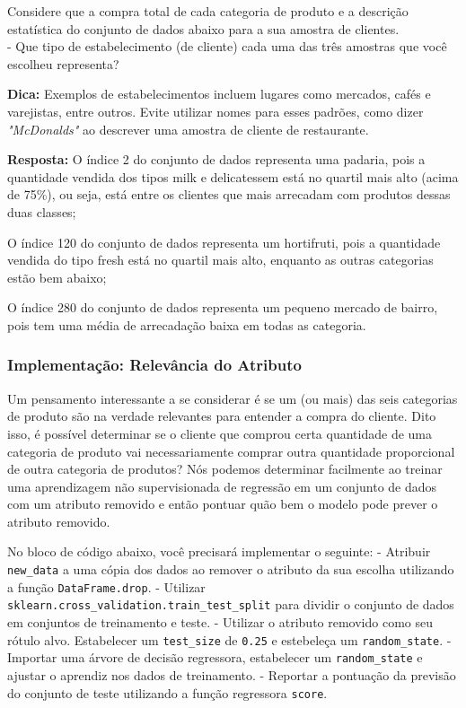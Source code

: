 \documentclass[11pt]{article}
\begin{document}
Considere que a compra total de cada categoria de produto e a descrição
estatística do conjunto de dados abaixo para a sua amostra de
clientes.\\
- Que tipo de estabelecimento (de cliente) cada uma das três amostras
que você escolheu representa?

\textbf{Dica:} Exemplos de estabelecimentos incluem lugares como
mercados, cafés e varejistas, entre outros. Evite utilizar nomes para
esses padrões, como dizer \emph{"McDonalds"} ao descrever uma amostra de
cliente de restaurante.

    \textbf{Resposta:} O índice 2 do conjunto de dados representa uma
padaria, pois a quantidade vendida dos tipos milk e delicatessem está no
quartil mais alto (acima de 75\%), ou seja, está entre os clientes que
mais arrecadam com produtos dessas duas classes;

O índice 120 do conjunto de dados representa um hortifruti, pois a
quantidade vendida do tipo fresh está no quartil mais alto, enquanto as
outras categorias estão bem abaixo;

O índice 280 do conjunto de dados representa um pequeno mercado de
bairro, pois tem uma média de arrecadação baixa em todas as categoria.

    \subsubsection{Implementação: Relevância do
Atributo}\label{implementauxe7uxe3o-relevuxe2ncia-do-atributo}

Um pensamento interessante a se considerar é se um (ou mais) das seis
categorias de produto são na verdade relevantes para entender a compra
do cliente. Dito isso, é possível determinar se o cliente que comprou
certa quantidade de uma categoria de produto vai necessariamente comprar
outra quantidade proporcional de outra categoria de produtos? Nós
podemos determinar facilmente ao treinar uma aprendizagem não
supervisionada de regressão em um conjunto de dados com um atributo
removido e então pontuar quão bem o modelo pode prever o atributo
removido.

No bloco de código abaixo, você precisará implementar o seguinte: -
Atribuir \texttt{new\_data} a uma cópia dos dados ao remover o atributo
da sua escolha utilizando a função \texttt{DataFrame.drop}. - Utilizar
\texttt{sklearn.cross\_validation.train\_test\_split} para dividir o
conjunto de dados em conjuntos de treinamento e teste. - Utilizar o
atributo removido como seu rótulo alvo. Estabelecer um
\texttt{test\_size} de \texttt{0.25} e estebeleça um
\texttt{random\_state}. - Importar uma árvore de decisão regressora,
estabelecer um \texttt{random\_state} e ajustar o aprendiz nos dados de
treinamento. - Reportar a pontuação da previsão do conjunto de teste
utilizando a função regressora \texttt{score}.
\end{document}
